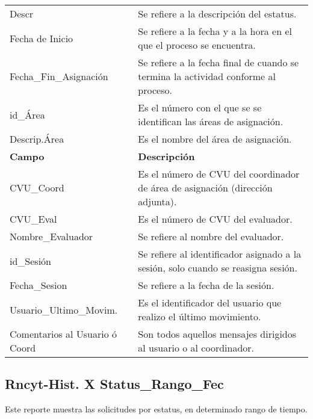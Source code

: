 \begin{tabular}{ m{} m{}  }%
	\rowcolor{gray1}Descr & Se refiere a la descripción del estatus.\\
	Fecha de Inicio & Se refiere a la fecha y a la hora en el que el proceso se encuentra.\\
	\rowcolor{gray1}Fecha\_Fin\_Asignación & Se refiere a la fecha final de cuando se termina la actividad conforme al proceso. \\
	id\_Área & Es el número con el que se se identifican las áreas de asignación.\\
	\rowcolor{gray1}Descrip.Área & Es el nombre del área de asignación.\\
	\rowcolor{gray1} {\bf Campo} &  {\bf Descripción} \\ \hline \hline
	CVU\_Coord & Es el número de CVU del coordinador de área de asignación (dirección adjunta).\\
	\rowcolor{gray1}CVU\_Eval & Es el número de CVU del evaluador.\\
	Nombre\_Evaluador & Se refiere al nombre del evaluador.\\
	\rowcolor{gray1}id\_Sesión & Se refiere al identificador asignado a la sesión, solo cuando se reasigna sesión.\\
	Fecha\_Sesion & Se refiere a la fecha de la sesión.\\
	\rowcolor{gray1}Usuario\_Ultimo\_Movim. & Es el identificador del usuario que realizo el último movimiento.\\
	Comentarios al Usuario ó Coord & Son todos aquellos mensajes dirigidos al usuario o al coordinador.\\
\end{tabular}

\subsection{Rncyt-Hist. X Status\_Rango\_Fec}
\label{appendix:Reportes:PeopleSoft:RncytHistStatusRangoFecha}

Este reporte muestra las solicitudes por estatus, en determinado rango de tiempo.\\

